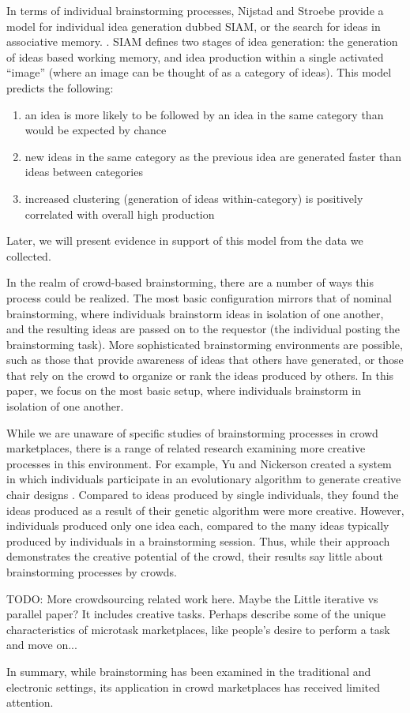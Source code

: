In terms of individual brainstorming processes, Nijstad and Stroebe provide a model for individual idea generation dubbed SIAM, or the search for ideas in associative memory. \cite{nijstad_how_2006}. SIAM defines two stages of idea generation: the generation of ideas based working memory, and idea production within a single activated ``image'' (where an image can be thought of as a category of ideas). This model predicts the following:

\begin{enumerate}
\item an idea is more likely to be followed by an idea in the same category than would be expected by chance
\item new ideas in the same category as the previous idea are generated faster than ideas between categories
\item increased clustering (generation of ideas within-category) is positively correlated with overall high production
\end{enumerate}

Later, we will present evidence in support of this model from the data we collected.

In the realm of crowd-based brainstorming, there are a number of ways this process could be realized. The most basic configuration mirrors that of nominal brainstorming, where individuals brainstorm ideas in isolation of one another, and the resulting ideas are passed on to the requestor (the individual posting the brainstorming task). More sophisticated brainstorming environments are possible, such as those that provide awareness of ideas that others have generated, or those that rely on the crowd to organize or rank the ideas produced by others. In this paper, we focus on the most basic setup, where individuals brainstorm in isolation of one another.

While we are unaware of specific studies of brainstorming processes in crowd marketplaces, there is a range of related research examining more creative processes in this environment. For example, Yu and Nickerson created a system in which individuals participate in an evolutionary algorithm to generate creative chair designs \cite{yu_cooks_2011}. Compared to ideas produced by single individuals, they found the ideas produced as a result of their genetic algorithm were more creative. However, individuals produced only one idea each, compared to the many ideas typically produced by individuals in a brainstorming session. Thus, while their approach demonstrates the creative potential of the crowd, their results say little about brainstorming processes by crowds.

TODO: More crowdsourcing related work here. Maybe the Little iterative vs parallel paper? It includes creative tasks. Perhaps describe some of the unique characteristics of microtask marketplaces, like people's desire to perform a task and move on...

In summary, while brainstorming has been examined in the traditional and electronic settings, its application in crowd marketplaces has received limited attention. 
